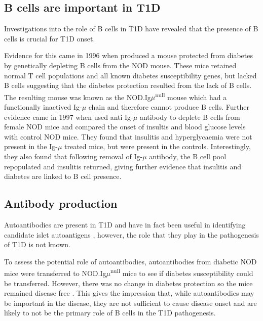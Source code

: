 \subsection{B cells are important in T1D}

Investigations into the role of B cells in T1D have revealed that the presence of B cells is crucial for T1D onset.

Evidence for this came in 1996 when \citet{Serreze1996} produced a mouse protected from diabetes by genetically depleting B cells from the NOD mouse.
These mice retained normal T cell populations and all known diabetes susceptibility genes, but lacked B cells suggesting that the diabetes protection resulted from the lack of B cells.
The resulting mouse was known as the NOD.Ig$\mu$\textsuperscript{null} mouse which had a functionally inactived Ig-$\mu$ chain and therefore cannot produce B cells.
Further evidence came in 1997 when \citet{Noorchashm1997} used anti Ig-$\mu$ antibody to deplete B cells from female NOD mice and compared the onset of insultis and blood glucose levels with control NOD mice.
They found that insulitis and hyperglycaemia were not present in the Ig-$\mu$ treated mice, but were present in the controls.
Interestingly, they also found that following removal of Ig-$\mu$ antibody, the B cell pool repopulated and insulitis returned, giving further evidence that insulitis and diabetes are linked to B cell presence.




\subsection{Antibody production}

Autoantibodies are present in T1D and have in fact been useful in identifying candidate islet autoantigens \citep{Roep2012}, however, the role that they play in the pathogenesis of T1D is not known.

To assess the potential role of autoantibodies, autoantibodies from diabetic NOD mice were transferred to NOD.Ig$\mu$\textsuperscript{null} mice to see if diabetes susceptibility could be transferred.
However, there was no change in diabetes protection so the mice remained disease free \citep{Serreze1998}.
This gives the impression that, while autoantibodies may be important in the disease, they are not sufficient to cause disease onset and are likely to not be the primary role of B cells in the T1D pathogenesis.

